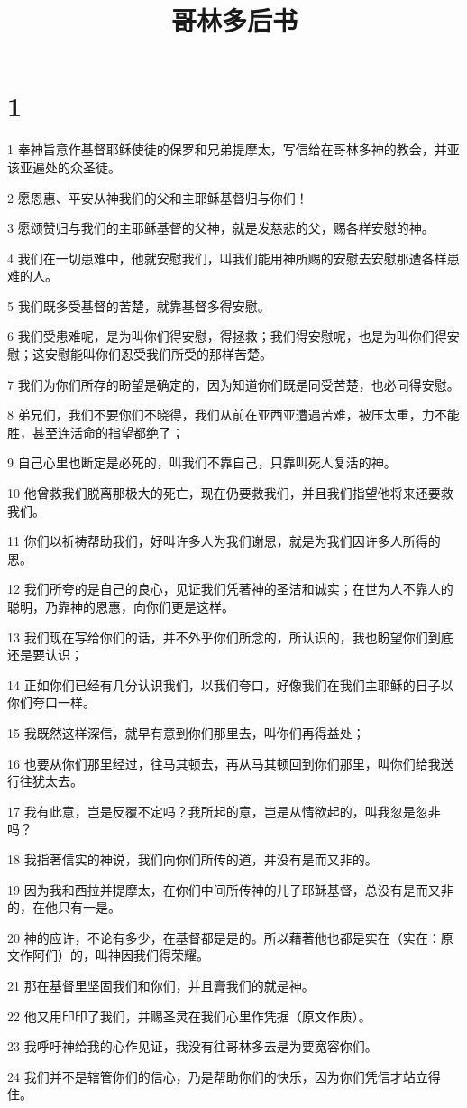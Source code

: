 

\title{哥林多后书}


\chapter{1}

\par 1 奉神旨意作基督耶稣使徒的保罗和兄弟提摩太，写信给在哥林多神的教会，并亚该亚遍处的众圣徒。
\par 2 愿恩惠、平安从神我们的父和主耶稣基督归与你们！
\par 3 愿颂赞归与我们的主耶稣基督的父神，就是发慈悲的父，赐各样安慰的神。
\par 4 我们在一切患难中，他就安慰我们，叫我们能用神所赐的安慰去安慰那遭各样患难的人。
\par 5 我们既多受基督的苦楚，就靠基督多得安慰。
\par 6 我们受患难呢，是为叫你们得安慰，得拯救；我们得安慰呢，也是为叫你们得安慰；这安慰能叫你们忍受我们所受的那样苦楚。
\par 7 我们为你们所存的盼望是确定的，因为知道你们既是同受苦楚，也必同得安慰。
\par 8 弟兄们，我们不要你们不晓得，我们从前在亚西亚遭遇苦难，被压太重，力不能胜，甚至连活命的指望都绝了；
\par 9 自己心里也断定是必死的，叫我们不靠自己，只靠叫死人复活的神。
\par 10 他曾救我们脱离那极大的死亡，现在仍要救我们，并且我们指望他将来还要救我们。
\par 11 你们以祈祷帮助我们，好叫许多人为我们谢恩，就是为我们因许多人所得的恩。
\par 12 我们所夸的是自己的良心，见证我们凭著神的圣洁和诚实；在世为人不靠人的聪明，乃靠神的恩惠，向你们更是这样。
\par 13 我们现在写给你们的话，并不外乎你们所念的，所认识的，我也盼望你们到底还是要认识；
\par 14 正如你们已经有几分认识我们，以我们夸口，好像我们在我们主耶稣的日子以你们夸口一样。
\par 15 我既然这样深信，就早有意到你们那里去，叫你们再得益处；
\par 16 也要从你们那里经过，往马其顿去，再从马其顿回到你们那里，叫你们给我送行往犹太去。
\par 17 我有此意，岂是反覆不定吗？我所起的意，岂是从情欲起的，叫我忽是忽非吗？
\par 18 我指著信实的神说，我们向你们所传的道，并没有是而又非的。
\par 19 因为我和西拉并提摩太，在你们中间所传神的儿子耶稣基督，总没有是而又非的，在他只有一是。
\par 20 神的应许，不论有多少，在基督都是是的。所以藉著他也都是实在（实在：原文作阿们）的，叫神因我们得荣耀。
\par 21 那在基督里坚固我们和你们，并且膏我们的就是神。
\par 22 他又用印印了我们，并赐圣灵在我们心里作凭据（原文作质）。
\par 23 我呼吁神给我的心作见证，我没有往哥林多去是为要宽容你们。
\par 24 我们并不是辖管你们的信心，乃是帮助你们的快乐，因为你们凭信才站立得住。

